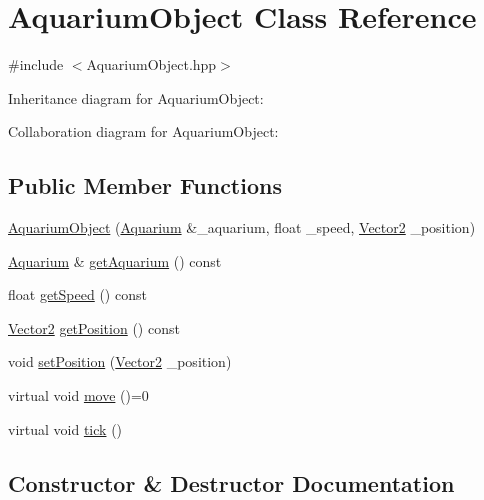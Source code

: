 \hypertarget{class_aquarium_object}{}\section{Aquarium\+Object Class Reference}
\label{class_aquarium_object}


{\ttfamily \#include $<$Aquarium\+Object.\+hpp$>$}



Inheritance diagram for Aquarium\+Object\+:


Collaboration diagram for Aquarium\+Object\+:
\subsection*{Public Member Functions}
\begin{DoxyCompactItemize}
\item 
\mbox{\hyperlink{class_aquarium_object_aebe6958a63cab1a4277006d335d3c968}{Aquarium\+Object}} (\mbox{\hyperlink{class_aquarium}{Aquarium}} \&\+\_\+aquarium, float \+\_\+speed, \mbox{\hyperlink{struct_vector2}{Vector2}} \+\_\+position)
\item 
\mbox{\hyperlink{class_aquarium}{Aquarium}} \& \mbox{\hyperlink{class_aquarium_object_a229f2c41d3aa352bcbd7b994dd540f97}{get\+Aquarium}} () const
\item 
float \mbox{\hyperlink{class_aquarium_object_a0e554167f04a77e452d5714d31fadada}{get\+Speed}} () const
\item 
\mbox{\hyperlink{struct_vector2}{Vector2}} \mbox{\hyperlink{class_aquarium_object_aed4986687e54beb0ce780a9cafbda990}{get\+Position}} () const
\item 
void \mbox{\hyperlink{class_aquarium_object_a2ec88f59595aec6ad788b90e9896b9b9}{set\+Position}} (\mbox{\hyperlink{struct_vector2}{Vector2}} \+\_\+position)
\item 
virtual void \mbox{\hyperlink{class_aquarium_object_a42c4de640f89ac8aebc26b7618578575}{move}} ()=0
\item 
virtual void \mbox{\hyperlink{class_aquarium_object_a3a8269dfe29631656916cce254e77059}{tick}} ()
\end{DoxyCompactItemize}


\subsection{Constructor \& Destructor Documentation}
\mbox{\label{class_aquarium_object_aebe6958a63cab1a4277006d335d3c968}} 
